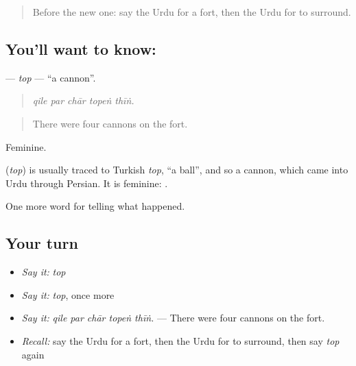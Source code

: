 \label{lesson:UR-C309-top}



\begin{quote}
Before the new one: say the Urdu for a fort, then the Urdu for to surround.
\end{quote}

\subsection*{You'll want to know: }
\textbf{} — \emph{top} — \textquotedblleft{}a cannon\textquotedblright{}.

\begin{quote}
    
\end{quote}

\begin{quote}
\emph{qile par chār topeṅ thīṅ.}
\end{quote}

\begin{quote}
There were four cannons on the fort.
\end{quote}

Feminine.

\begin{cousinweb}
\textbf{} (\emph{top}) is usually traced to Turkish \emph{top}, \textquotedblleft{}a ball\textquotedblright{}, and so a cannon, which came into Urdu through Persian. It is feminine: \textbf{ }.
\end{cousinweb}

\begin{grammarlens}[title={What you've built}]
One more word for telling what happened.
\end{grammarlens}

\subsection*{Your turn}
\begin{itemize}
\raggedright
  \item \emph{Say it:} \emph{top}
  \item \emph{Say it:} \emph{top}, once more
  \item \emph{Say it:} \emph{qile par chār topeṅ thīṅ.} — There were four cannons on the fort.
  \item \emph{Recall:} say the Urdu for a fort, then the Urdu for to surround, then say \emph{top} again
\end{itemize}

